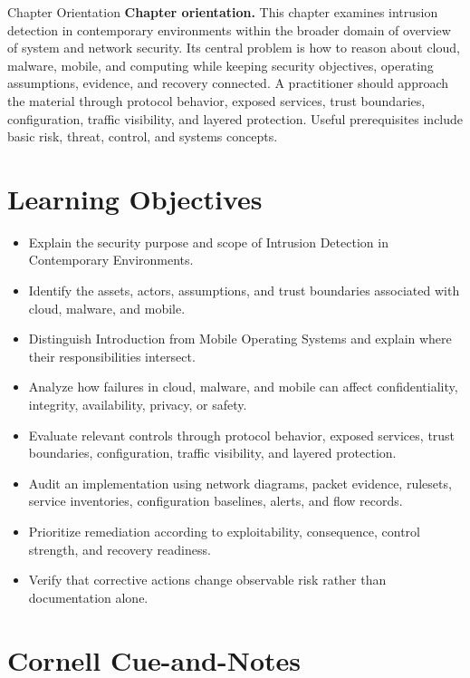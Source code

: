 \documentclass[11pt,letterpaper]{article}
\title{\CornellDocumentTitle}
\author{}
\date{}
\begin{document}
\maketitle
\begin{CornellOverviewBox}{Chapter Orientation}
\textbf{Chapter orientation.} This chapter examines intrusion detection in contemporary environments within the broader domain of overview of system and network security. Its central problem is how to reason about cloud, malware, mobile, and computing while keeping security objectives, operating assumptions, evidence, and recovery connected. A practitioner should approach the material through protocol behavior, exposed services, trust boundaries, configuration, traffic visibility, and layered protection. Useful prerequisites include basic risk, threat, control, and systems concepts.
\end{CornellOverviewBox}
\section*{Learning Objectives}
\begin{itemize}
\item Explain the security purpose and scope of Intrusion Detection in Contemporary Environments.
\item Identify the assets, actors, assumptions, and trust boundaries associated with cloud, malware, and mobile.
\item Distinguish Introduction from Mobile Operating Systems and explain where their responsibilities intersect.
\item Analyze how failures in cloud, malware, and mobile can affect confidentiality, integrity, availability, privacy, or safety.
\item Evaluate relevant controls through protocol behavior, exposed services, trust boundaries, configuration, traffic visibility, and layered protection.
\item Audit an implementation using network diagrams, packet evidence, rulesets, service inventories, configuration baselines, alerts, and flow records.
\item Prioritize remediation according to exploitability, consequence, control strength, and recovery readiness.
\item Verify that corrective actions change observable risk rather than documentation alone.
\end{itemize}
\section*{Cornell Cue-and-Notes}
\end{document}
